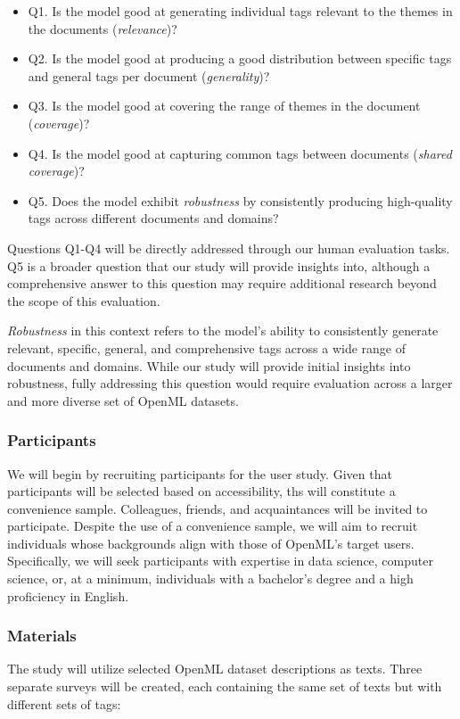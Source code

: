 \begin{itemize}
\item Q1. Is the model good at generating individual tags relevant to the themes in the documents (\textit{relevance})?
\item Q2. Is the model good at producing a good distribution between specific tags and general tags per document (\textit{generality})?
\item Q3. Is the model good at covering the range of themes in the document (\textit{coverage})?
\item Q4. Is the model good at capturing common tags between documents (\textit{shared coverage})?
\item Q5. Does the model exhibit \textit{robustness} by consistently producing high-quality tags across different documents and domains?
\end{itemize}

Questions Q1-Q4 will be directly addressed through our human evaluation tasks. Q5 is a broader question that our study will provide insights into, although a comprehensive answer to this question may require additional research beyond the scope of this evaluation.

\textit{Robustness} in this context refers to the model's ability to consistently generate relevant, specific, general, and comprehensive tags across a wide range of documents and domains. While our study will provide initial insights into robustness, fully addressing this question would require evaluation across a larger and more diverse set of OpenML datasets.

\subsubsection{Participants}
We will begin by recruiting participants for the user study. Given that participants will be selected based on accessibility, ths will constitute a convenience sample. Colleagues, friends, and acquaintances will be invited to participate. Despite the use of a convenience sample, we will aim to recruit individuals whose backgrounds align with those of OpenML's target users. Specifically, we will seek participants with expertise in data science, computer science, or, at a minimum, individuals with a bachelor's degree and a high proficiency in English.

\subsubsection{Materials}
The study will utilize selected OpenML dataset descriptions as texts. Three separate surveys will be created, each containing the same set of texts but with different sets of tags:

